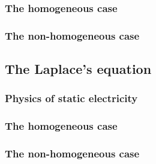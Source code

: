 \subsubsection{The homogeneous case}

\subsubsection{The non-homogeneous case}


\subsection{The Laplace's equation}

\subsubsection{Physics of static electricity}

\subsubsection{The homogeneous case}

\subsubsection{The non-homogeneous case}